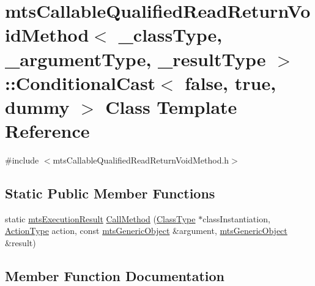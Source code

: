 \hypertarget{classmts_callable_qualified_read_return_void_method_1_1_conditional_cast_3_01false_00_01true_00_01dummy_01_4}{}\section{mts\+Callable\+Qualified\+Read\+Return\+Void\+Method$<$ \+\_\+class\+Type, \+\_\+argument\+Type, \+\_\+result\+Type $>$\+:\+:Conditional\+Cast$<$ false, true, dummy $>$ Class Template Reference}
\label{classmts_callable_qualified_read_return_void_method_1_1_conditional_cast_3_01false_00_01true_00_01dummy_01_4}


{\ttfamily \#include $<$mts\+Callable\+Qualified\+Read\+Return\+Void\+Method.\+h$>$}

\subsection*{Static Public Member Functions}
\begin{DoxyCompactItemize}
\item 
static \hyperlink{classmts_execution_result}{mts\+Execution\+Result} \hyperlink{classmts_callable_qualified_read_return_void_method_1_1_conditional_cast_3_01false_00_01true_00_01dummy_01_4_ad8466b711cfeab24a216037d6cb096ab}{Call\+Method} (\hyperlink{classmts_callable_qualified_read_return_void_method_ae99cfab8208eb374f2cdf01c97edfa3b}{Class\+Type} $\ast$class\+Instantiation, \hyperlink{classmts_callable_qualified_read_return_void_method_a90bf5eae1c7fdee0396313ce6de022bb}{Action\+Type} action, const \hyperlink{classmts_generic_object}{mts\+Generic\+Object} \&argument, \hyperlink{classmts_generic_object}{mts\+Generic\+Object} \&result)
\end{DoxyCompactItemize}


\subsection{Member Function Documentation}
\hypertarget{classmts_callable_qualified_read_return_void_method_1_1_conditional_cast_3_01false_00_01true_00_01dummy_01_4_ad8466b711cfeab24a216037d6cb096ab}{}
